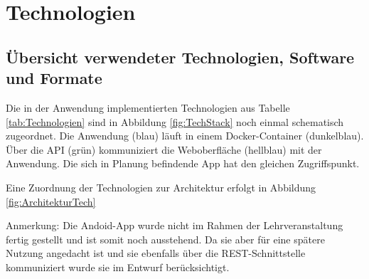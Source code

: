 
\section{Technologien}

\subsection{Übersicht verwendeter Technologien, Software  \newline und Formate}

Die in der Anwendung implementierten Technologien aus Tabelle \ref{tab:Technologien}  sind in Abbildung \ref{fig:TechStack} noch einmal schematisch zugeordnet. 
Die Anwendung (blau) läuft in einem Docker-Container (dunkelblau). Über die API (grün) kommuniziert die Weboberfläche (hellblau) mit der Anwendung. Die sich in Planung befindende App hat den gleichen Zugriffspunkt. 

Eine Zuordnung der Technologien zur Architektur erfolgt in Abbildung \ref{fig:ArchitekturTech}

Anmerkung: Die Andoid-App wurde nicht im Rahmen der Lehrveranstaltung fertig gestellt und ist somit noch ausstehend. Da sie aber für eine spätere Nutzung angedacht ist und sie ebenfalls über die REST-Schnittstelle kommuniziert wurde sie im Entwurf berücksichtigt. 

